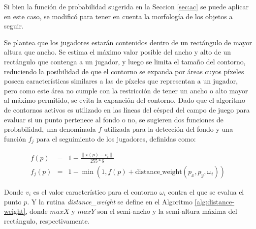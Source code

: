 Si bien la función de probabilidad sugerida en la Seccion \ref{sec:ac} se puede
aplicar en este caso, se modificó para tener en cuenta la morfología de los objetos
a seguir.

Se plantea que los jugadores estarán contenidos dentro de un rectángulo de
mayor altura que ancho. Se estima el máximo valor posible del ancho y alto de
un rectángulo que contenga a un jugador, y luego se limita el tamaño del
contorno, reduciendo la posibilidad de que el contorno se expanda por áreas
cuyos píxeles poseen características similares a las de píxeles que representan
a un jugador, pero como este área no cumple con la restricción de tener un
ancho o alto mayor al máximo permitido, se evita la expanción del contorno.
Dado que el algoritmo de contornos activos es utilizado en las líneas del
césped del campo de juego para evaluar si un punto pertenece al fondo o no, se
sugieren dos funciones de probabilidad, una denominada $f$ utilizada para la
detección del fondo y una función $f_j$ para el seguimiento de los jugadores,
definidas como:

\begin{eqnarray*}
    f(p) &=& 1 - \frac{\| v(p) - v_i \|}{255 * 6} \\
    f_j(p) &=& 1 - \min(1, f(p) + \text{distance\_weight}(p_x, p_y, \omega_i))
\end{eqnarray*}

Donde $v_i$ es el valor característico para el contorno $\omega_i$ contra el
que se evalua el punto $p$. Y la rutina \textit{distance\_weight} se define en
el Algoritmo \ref{alg:distance-weight}, donde $maxX$ y $maxY$ son el semi-ancho
y la semi-altura máxima del rectángulo, respectivamente.

